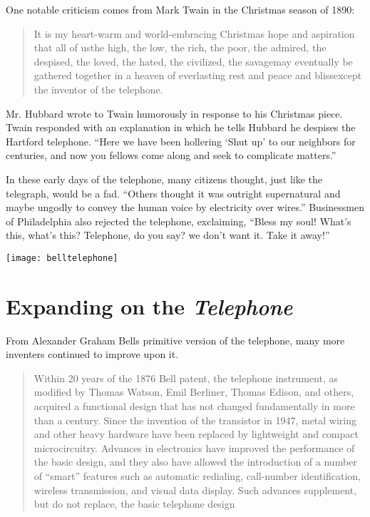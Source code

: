 \documentclass[12pt singlecol]{article}
\newenvironment{Figure}
  {\par\medskip\noindent\minipage{\linewidth}}
  {\endminipage\par\medskip}
\begin{document}
\begin{flushleft}
\begin{multicols}{2}
One notable criticism comes from Mark Twain in the Christmas season of 1890:

\begin{quotation}
It is my heart-warm and world-embracing Christmas hope and aspiration that all of us\textemdash the high, the low, the rich, the poor, the admired, the despised, the loved, the hated, the civilized, the savage\textemdash may eventually be gathered together in a heaven of everlasting rest and peace and bliss\textemdash except the inventor of the telephone.\cite[p.~8]{Coe95}
\end{quotation}

Mr. Hubbard wrote to Twain humorously in response to his Christmas piece. Twain responded with an explanation in which he tells Hubbard he despises the Hartford telephone. ``Here we have been hollering `Shut up' to our neighbors for centuries, and now you fellows come along and seek to complicate matters.'' \cite[p.~8]{Coe95}

In these early days of the telephone, many citizens thought, just like the telegraph, would be a fad. ``Others thought it was outright supernatural and maybe ungodly to convey the human voice by electricity over wires.''\cite[p.~8]{Coe95} Businessmen of Philadelphia also rejected the telephone, exclaiming, ``Bless my soul! What's this, what's this? Telephone, do you say? we don't want it. Take it away!''\cite[p.~9]{Coe95}

\begin{Figure}
	\centering
	\texttt{[image: belltelephone]}
	\label{fig:telephone}
\end{Figure}

\section{Expanding on the \emph{Telephone}}

From Alexander Graham Bells primitive version of the telephone, many more inventers continued to improve upon it. 

\begin{quotation}
Within 20 years of the 1876 Bell patent, the telephone instrument, as modified by Thomas Watson, Emil Berliner, Thomas Edison, and others, acquired a functional design that has not changed fundamentally in more than a century. Since the invention of the transistor in 1947, metal wiring and other heavy hardware have been replaced by lightweight and compact microcircuitry. Advances in electronics have improved the performance of the basic design, and they also have allowed the introduction of a number of “smart” features such as automatic redialing, call-number identification, wireless transmission, and visual data display. Such advances supplement, but do not replace, the basic telephone design \cite[para.~3]{Encyc13}
\end{quotation}


\end{multicols}
\end{flushleft}
\end{document}
